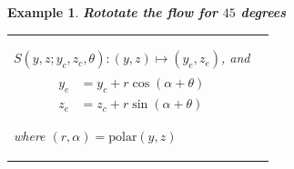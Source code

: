 \documentclass[dvips,landscape]{foils}
\newtheorem{example}{Example}
\begin{document}
\newpage
\begin{example}{\bfseries Rototate the flow for $45$ degrees}
\begin{tabular}{lr}
 \begin{minipage}[b]{12cm}
\vspace{0.5cm}
$S(y,z;y_c,z_c,\theta): (y,z)\mapsto (y_e,z_e)$, and
  \begin{eqnarray*}
  \\[-2cm]
     y_e &= y_c + r \cos(\alpha+\theta) \\
     z_e &= z_c + r \sin(\alpha+\theta)
  \end{eqnarray*} 

where $(r,\alpha)=\text{polar}(y,z)$
 

\end{minipage}
\end{tabular}
\end{example}
\end{document}

